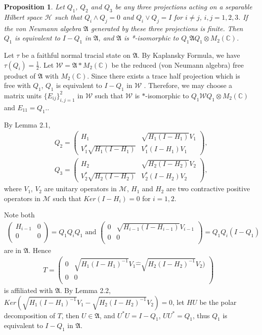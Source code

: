 \documentclass[12pt]{article}
\newtheorem{prop}{Proposition}[section]
\newcommand{\AAA}{\mathfrak A}
\newcommand{\HHH}{\mathcal H} %
\newcommand{\MMM}{\mathcal M}
\newcommand{\WWW}{\mathcal W}
\newcommand{\C}{\mathbb C} %
\begin{document}
{\begin{prop}
Let $Q_1$, $Q_2$ and $Q_3$ be any three projections acting on a
separable Hilbert space $\HHH$ such that $Q_i \wedge Q_j = 0$ and
$Q_i \vee Q_j = I$ for $i \neq j$, $i,j=1,2,3$. If the
von Neumann algebra $\AAA$ generated by these three projections is finite. Then $Q_1$ is equivalent to $I-Q_1$ in
$\AAA$, and $\AAA$ is *-isomorphic to $Q_1 \AAA Q_1 \otimes
M_2(\C)$. 
\end{prop}

\quad Let $\tau$ be a faithful  normal tracial
state  on $\AAA$. By Kaplansky Formula,  we have $\tau(Q_i) =
\frac{1}{2}$. Let $\WWW =\AAA
* M_{2}(\C)$ be the reduced (von Neumann algebra) free product of
$\AAA$ with $M_2(\C)$. Since there exists a trace half projection which is free with $Q_1$, $Q_1$ is equivalent to $I-Q_1$ in $\WWW$ \cite{GY2}.
Therefore, we may choose a matrix units $\{ E_{ij} \}_{i,j = 1}^{2}$ in
$\WWW$ such that $\WWW$ is $\ast$-isomorphic to $Q_1\WWW Q_1 \otimes
M_2(\C)$ and $E_{11} = Q_1$..


By Lemma 2.1,
\begin{align*}
&Q_2 = \left(\begin{array}{cc}H_1 & \sqrt{H_1 (I-H_1)}V_1 \\V_1^*
\sqrt{H_1 (I-H_1)} & V_1^{*}(I - H_1)V_1\end{array}\right),\\
&Q_3 = \left(\begin{array}{cc}H_2 & \sqrt{H_2(I-H_2)}V_2 \\V_2^*
\sqrt{H_2(I-H_2)} & V_2^{*}(I - H_2)V_2\end{array}\right),
\end{align*}
where $V_1$, $V_2$ are unitary operators in $\MMM$, $H_1$ and $H_2$
are two contractive positive operators in $\MMM$ such that
$Ker(I-H_i) =0$ for $i = 1,2$.

Note both
\begin{align*} \left(
  \begin{array}{cc}
    H_{i-1} &  0\\
    0 & 0 \\
  \end{array}
\right)=Q_1Q_iQ_1 \mbox{ and }
\left(
  \begin{array}{cc}
    0 &  \sqrt{H_{i-1}(I-H_{i-1})}V_{i-1}\\
    0 & 0 \\
  \end{array} 
\right)=Q_1Q_i(I-Q_1)
\end{align*}
are in $\AAA$. Hence
\begin{align*}
T = \left(
  \begin{array}{cc}
    0 &  \sqrt{H_1(I-H_1)^{-1}}V_1 \widehat{-}\sqrt{H_2(I-H_2)^{-1}}V_2)\\
    0 & 0 \\
  \end{array}
\right)
\end{align*}
is affiliated with $\AAA$. By Lemma 2.2,
$Ker(\sqrt{H_1(I-H_1)^{-1}}V_1-\sqrt{H_2(I-H_2)^{-1}}V_2) = 0$,
let $HU$ be the polar decomposition of $T$, then $U\in \AAA$,
and $U^*U = I-Q_1$, $UU^{*} = Q_1$, thus $Q_1$ is equivalent to $I-
Q_1$ in $\AAA$.\vspace{2mm}

}
\end{document}
